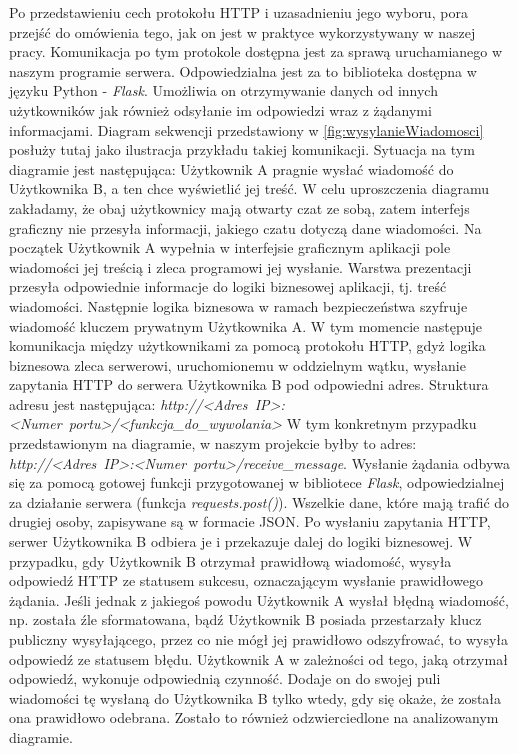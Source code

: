 \par Po przedstawieniu cech protokołu HTTP i uzasadnieniu jego wyboru, pora przejść do omówienia tego, jak on jest w praktyce wykorzystywany w naszej pracy. Komunikacja po tym protokole dostępna jest za sprawą uruchamianego w naszym programie serwera. Odpowiedzialna jest za to biblioteka dostępna w języku Python - \textit{Flask}. Umożliwia on otrzymywanie danych od innych użytkowników jak również odsyłanie im odpowiedzi wraz z żądanymi informacjami. Diagram sekwencji przedstawiony w \figurename{ \ref{fig:wysylanieWiadomosci}} posłuży tutaj jako ilustracja przykładu takiej komunikacji. Sytuacja na tym diagramie jest następująca: Użytkownik A pragnie wysłać wiadomość do Użytkownika B, a ten chce wyświetlić jej treść. W celu uproszczenia diagramu zakładamy, że obaj użytkownicy mają otwarty czat ze sobą, zatem interfejs graficzny nie przesyła informacji, jakiego czatu dotyczą dane wiadomości. Na początek Użytkownik A wypełnia w interfejsie graficznym aplikacji pole wiadomości jej treścią i zleca programowi jej wysłanie. Warstwa prezentacji przesyła odpowiednie informacje do logiki biznesowej aplikacji, tj. treść wiadomości. Następnie logika biznesowa w ramach bezpieczeństwa szyfruje wiadomość kluczem prywatnym Użytkownika A. W tym momencie następuje komunikacja między użytkownikami za pomocą protokołu HTTP, gdyż logika biznesowa zleca serwerowi, uruchomionemu w oddzielnym wątku, wysłanie zapytania HTTP do serwera Użytkownika B pod odpowiedni adres. Struktura adresu jest następująca: 
\textit{http://<Adres~IP>:<Numer~portu>/<funkcja\_do\_wywolania>}
W tym konkretnym przypadku przedstawionym na diagramie, w naszym projekcie byłby to adres: \textit{http://<Adres~IP>:<Numer~portu>/receive\_message}.
Wysłanie żądania odbywa się za pomocą gotowej funkcji przygotowanej w bibliotece \textit{Flask}, odpowiedzialnej za działanie serwera (funkcja \textit{requests.post()}). Wszelkie dane, które mają trafić do drugiej osoby, zapisywane są w formacie JSON. Po wysłaniu zapytania HTTP, serwer Użytkownika B odbiera je i przekazuje dalej do logiki biznesowej. W przypadku, gdy Użytkownik B otrzymał prawidłową wiadomość, wysyła odpowiedź HTTP ze statusem sukcesu, oznaczającym wysłanie prawidłowego żądania. Jeśli jednak z jakiegoś powodu Użytkownik A wysłał błędną wiadomość, np. została źle sformatowana, bądź Użytkownik B posiada przestarzały klucz publiczny wysyłającego, przez co nie mógł jej prawidłowo odszyfrować, to wysyła odpowiedź ze statusem błędu. Użytkownik A w zależności od tego, jaką otrzymał odpowiedź, wykonuje odpowiednią czynność. Dodaje on do swojej puli wiadomości tę wysłaną do Użytkownika B tylko wtedy, gdy się okaże, że została ona prawidłowo odebrana. Zostało to również odzwierciedlone na analizowanym diagramie.

